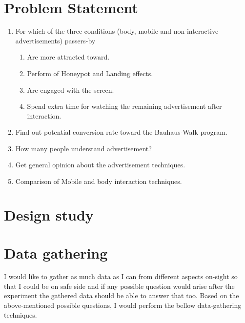 \section{Problem Statement}
\begin{enumerate}

\item	For which of the three conditions (body, mobile and non-interactive advertisements) passers-by 

\begin{enumerate}
\item	Are more attracted toward.
\item	Perform of Honeypot and Landing effects.
\item	Are engaged with the screen.
\item	Spend extra time for watching the remaining advertisement after interaction.
\end{enumerate}

\item Find out potential conversion rate toward the Bauhaus-Walk program.
\item	How many people understand advertisement?
\item	Get general opinion about the advertisement techniques.
\item	Comparison of Mobile and body interaction techniques.

\end{enumerate}






\section{Design study}






\section{Data gathering}
I would like to gather as much data as I can from different aspects on-sight so that I could be on safe side and if any possible question would arise after the experiment the gathered data should be able to answer that too. Based on the above-mentioned possible questions, I would perform the bellow data-gathering techniques.

